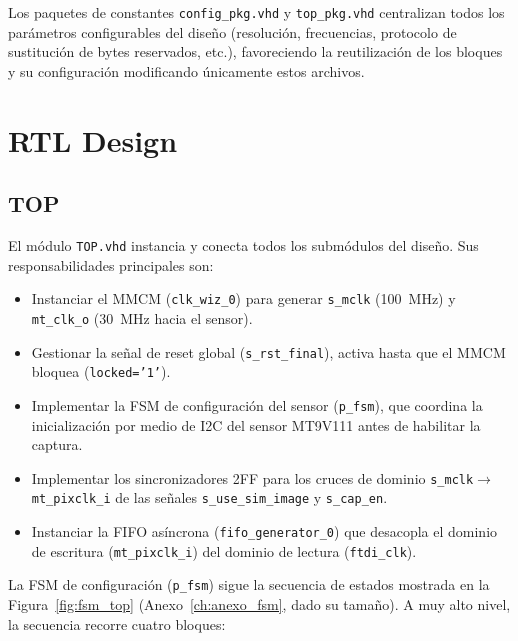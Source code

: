 \documentclass[../main.tex]{subfiles}
\begin{document}
Los paquetes de constantes \texttt{config\_pkg.vhd} y \texttt{top\_pkg.vhd} centralizan todos los parámetros configurables del diseño (resolución, frecuencias, protocolo de sustitución de bytes reservados, etc.), favoreciendo la reutilización de los bloques y su configuración modificando únicamente estos archivos.

\section{RTL Design}

\subsection{TOP}
\label{sec:top}

El módulo \texttt{TOP.vhd} instancia y conecta todos los submódulos del diseño. Sus responsabilidades principales son:

\begin{itemize}
    \item Instanciar el \ac{MMCM} (\texttt{clk\_wiz\_0}) para generar \texttt{s\_mclk} (100~MHz) y \texttt{mt\_clk\_o} (30~MHz hacia el sensor).
    \item Gestionar la señal de reset global (\texttt{s\_rst\_final}), activa hasta que el \ac{MMCM} bloquea (\texttt{locked='1'}).
    \item Implementar la \ac{FSM} de configuración del sensor (\texttt{p\_fsm}), que coordina la inicialización por medio de \ac{I2C} del sensor MT9V111 antes de habilitar la captura.
    \item Implementar los sincronizadores 2FF para los cruces de dominio \texttt{s\_mclk}$\rightarrow$\texttt{mt\_pixclk\_i} de las señales \texttt{s\_use\_sim\_image} y \texttt{s\_cap\_en}.
    \item Instanciar la FIFO asíncrona (\texttt{fifo\_generator\_0}) que desacopla el dominio de escritura (\texttt{mt\_pixclk\_i}) del dominio de lectura (\texttt{ftdi\_clk}).
\end{itemize}

La \ac{FSM} de configuración (\texttt{p\_fsm}) sigue la secuencia de estados mostrada en la Figura~\ref{fig:fsm_top} (Anexo~\ref{ch:anexo_fsm}, dado su tamaño). A muy alto nivel, la secuencia recorre cuatro bloques:
\end{document}
